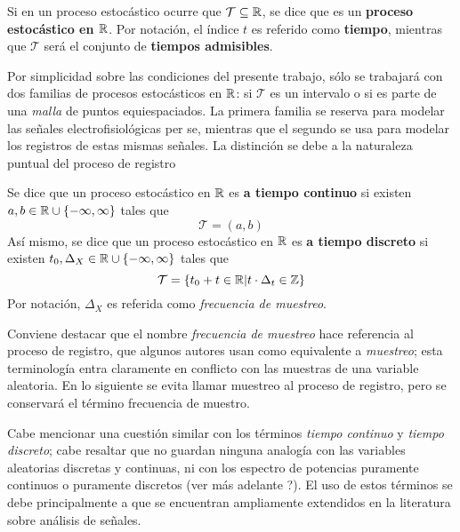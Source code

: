 \begin{definicion}
Si en un proceso estocástico \xt ocurre que $\mathcal{T} \subseteq \mathbb{R}$, se dice que es un \textbf{proceso estocástico en $\mathbb{R}$}.
%
Por notación, el índice $t$ es referido como \textbf{tiempo}, mientras que $\mathcal{T}$ será el conjunto de \textbf{tiempos admisibles}.
\end{definicion}

Por simplicidad sobre las condiciones del presente trabajo, sólo se trabajará con dos familias de procesos estocásticos en $\mathbb{R}$: si $\mathcal{T}$ es un intervalo o si es parte de una \textit{malla} de puntos equiespaciados. 
%
La primera familia se reserva para modelar las señales electrofisiológicas per se, mientras que el segundo se usa para modelar los registros de estas mismas señales.
%
La distinción se debe a la naturaleza puntual del proceso de registro

\begin{definicion}
Se dice que un proceso estocástico en $\mathbb{R}$ es \textbf{a tiempo continuo} si existen $a, b \in \mathbb{R} \cup \{ -\infty, \infty \}$ tales que
\begin{equation}
\mathcal{T} = (a,b)
\end{equation}
Así mismo, se dice que un proceso estocástico en $\mathbb{R}$ es \textbf{a tiempo discreto} si existen $t_0, \Delta_X \in \mathbb{R} \cup \{ -\infty, \infty \}$ tales que
\begin{equation}
\mathcal{T} = \left\{ t_0 + t \in \mathbb{R} | {t} \cdot {\Delta_t} \in \mathbb{Z} \right\}
\end{equation}
Por notación, $\Delta_X$ es referida como \textit{frecuencia de muestreo}.
\end{definicion}

Conviene destacar que el nombre \textit{frecuencia de muestreo} hace referencia al proceso de registro, que algunos autores usan como equivalente a \textit{muestreo}; esta terminología entra claramente en conflicto con las muestras de una variable aleatoria. En lo siguiente se evita llamar muestreo al proceso de registro, pero se conservará el término frecuencia de muestro.

Cabe mencionar una cuestión similar con los términos \textit{tiempo continuo} y \textit{tiempo discreto}; cabe resaltar que no guardan ninguna analogía con las variables aleatorias discretas y continuas, ni con los espectro de potencias puramente continuos o puramente discretos (ver más adelante ?).
%
El uso de estos términos se debe principalmente a que se encuentran ampliamente extendidos en la literatura sobre análisis de señales.

